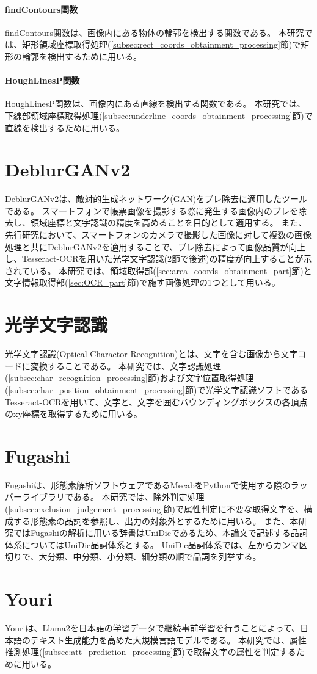 \paragraph{findContours関数}
findContours関数は、画像内にある物体の輪郭を検出する関数である。
本研究では、矩形領域座標取得処理(\ref{subsec:rect_coords_obtainment_processing}節)で矩形の輪郭を検出するために用いる。

\paragraph{HoughLinesP関数}
HoughLinesP関数は、画像内にある直線を検出する関数である。
本研究では、下線部領域座標取得処理(\ref{subsec:underline_coords_obtainment_processing}節)で直線を検出するために用いる。

\section{DeblurGANv2}\label{sec:DeblurGANv2}
DeblurGANv2は、敵対的生成ネットワーク(GAN)をブレ除去に適用したツールである\cite{DeblurGANv2}。
スマートフォンで帳票画像を撮影する際に発生する画像内のブレを除去し、領域座標と文字認識の精度を高めることを目的として適用する。
また、先行研究において、スマートフォンのカメラで撮影した画像に対して複数の画像処理と共にDeblurGANv2を適用することで、ブレ除去によって画像品質が向上し、Tesseract-OCRを用いた光学文字認識(\ref{sec:Optical-Charactor-Recognition}節で後述)の精度が向上することが示されている\cite{DeblurGANv2の先行研究}。
本研究では、領域取得部(\ref{sec:area_coords_obtainment_part}節)と文字情報取得部(\ref{sec:OCR_part}節)で施す画像処理の1つとして用いる。


\section{光学文字認識}\label{sec:Optical-Charactor-Recognition}
光学文字認識(Optical Charactor Recognition)とは、文字を含む画像から文字コードに変換することである\cite{光学文字認識}。
本研究では、文字認識処理(\ref{subsec:char_recognition_processing}節)および文字位置取得処理(\ref{subsec:char_position_obtainment_processing}節)で光学文字認識ソフトであるTesseract-OCRを用いて、文字と、文字を囲むバウンディングボックスの各頂点のxy座標を取得するために用いる。

\section{Fugashi}\label{sec:Fugashi}
Fugashiは、形態素解析ソフトウェアであるMecabをPythonで使用する際のラッパーライブラリである\cite{Fugashi}。
本研究では、除外判定処理(\ref{subsec:exclusion_judgement_processing}節)で属性判定に不要な取得文字を、構成する形態素の品詞を参照し、出力の対象外とするために用いる。
また、本研究ではFugashiの解析に用いる辞書はUniDicであるため、本論文で記述する品詞体系についてはUniDic品詞体系とする。
UniDic品詞体系では、左からカンマ区切りで、大分類、中分類、小分類、細分類の順で品詞を列挙する\cite{UniDic品詞体系}。


\section{Youri}\label{sec:Youri}
Youriは、Llama2を日本語の学習データで継続事前学習を行うことによって、日本語のテキスト生成能力を高めた大規模言語モデルである\cite{Youri}。
本研究では、属性推測処理(\ref{subsec:att_prediction_processing}節)で取得文字の属性を判定するために用いる。